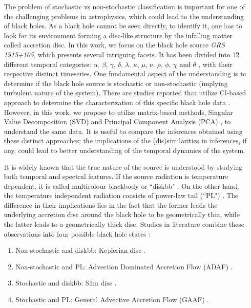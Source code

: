 \documentclass[journal]{IEEEtran}
\begin{document}
	The problem of stochastic vs non-stochastic classification is important for one of the challenging problems in astrophysics, which could lead to the understanding of black holes. As a black hole cannot be seen directly, to identify it, one has to look for its environment forming a disc-like structure by the infalling matter called accretion disc. In this work, we focus on the black hole source \textit{GRS 1915+105}, which presents several intriguing facets. It has been divided into 12 different temporal categories: $\alpha$, $\beta$, $\gamma$, $\delta$, $\lambda$, $\kappa$, $\mu$, $\nu$, $\rho$, $\phi$, $\chi$ and $\theta$ \cite{Belloni2000}, with their respective distinct timeseries. One fundamental aspect of the understanding is to determine if the black hole source is stochastic or non-stochastic (implying turbulent nature of the system). There are studies reported that utilize CI-based approach to determine the characterization of this specific black hole data \cite{Mukhopadhyay2004, misra2006}. However, in this work, we propose to utilize matrix-based methods, Singular Value Decomposition (SVD) and Principal Component Analysis (PCA) , to understand the same data. It is useful to compare the inferences obtained using these distinct approaches; the implications of the (dis)similarities in inferences, if any, could lead to better understanding of the temporal dynamics of the system.
	
	It is widely known that the true nature of the source is understood by studying both temporal and spectral features. If the source radiation is temperature dependent, it is called multicolour blackbody or ``diskbb" \cite{Shakura1973}. On the other hand, the temperature independent radiation consists of power-law tail (``PL") \cite{chakrabarti1995,narayan1994}. The difference in their implications lies in the fact that the former leads the underlying accretion disc around the black hole to be geometrically thin, while the latter leads to a geometrically thick disc. Studies in literature combine these observations into four possible black hole states \cite{Adegoke2018}:
	\begin{enumerate}
		\item Non-stochastic and diskbb: Keplerian disc \cite{Shakura1973}.
		\item Non-stochastic and PL: Advection Dominated Accretion Flow (ADAF)  \cite{narayan1994}.
		\item Stochastic and diskbb: Slim disc \cite{Abramowicz1988}.
		\item Stochastic and PL: General Advective Accretion Flow (GAAF) \cite{chakrabarti1995, rajesh2010}.
	\end{enumerate}
	
\end{document}
